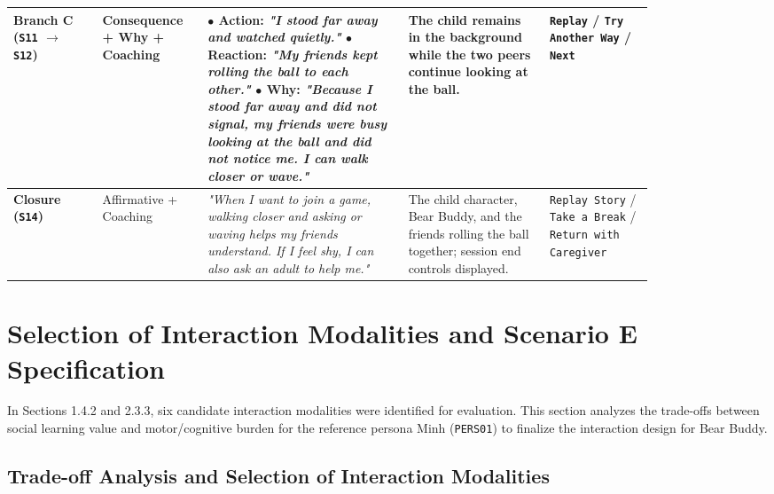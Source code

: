 \begin{footnotesize}
\begin{longtable}{|p{0.12\linewidth}|p{0.12\linewidth}|p{0.27\linewidth}|p{0.19\linewidth}|p{0.14\linewidth}|}
\textbf{Branch C (\texttt{S11} $\rightarrow$ \texttt{S12})} & Consequence + Why + Coaching & $\bullet$ \textbf{Action}: \textit{"I stood far away and watched quietly."} \newline $\bullet$ \textbf{Reaction}: \textit{"My friends kept rolling the ball to each other."} \newline $\bullet$ \textbf{Why}: \textit{"Because I stood far away and did not signal, my friends were busy looking at the ball and did not notice me. I can walk closer or wave."} & The child remains in the background while the two peers continue looking at the ball. & \texttt{Replay} / \texttt{Try Another Way} / \texttt{Next} \\ \hline
\textbf{Closure (\texttt{S14})} & Affirmative + Coaching & \textit{"When I want to join a game, walking closer and asking or waving helps my friends understand. If I feel shy, I can also ask an adult to help me."} & The child character, Bear Buddy, and the friends rolling the ball together; session end controls displayed. & \texttt{Replay Story} / \texttt{Take a Break} / \texttt{Return with Caregiver} \\ \hline
\end{longtable}
\setlength{\tabcolsep}{6pt}
\end{footnotesize}



\section{Selection of Interaction Modalities and Scenario E Specification}


In Sections 1.4.2 and 2.3.3, six candidate interaction modalities were identified for evaluation. This section analyzes the trade-offs between social learning value and motor/cognitive burden for the reference persona Minh (\texttt{PERS01}) to finalize the interaction design for Bear Buddy.


\subsection{Trade-off Analysis and Selection of Interaction Modalities}


